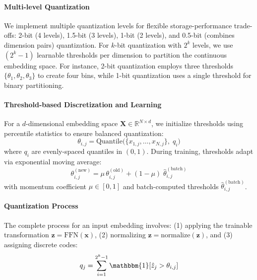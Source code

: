 \paragraph{Multi-level Quantization}
We implement multiple quantization levels for flexible storage-performance trade-offs: 2-bit (4 levels), 1.5-bit (3 levels), 1-bit (2 levels), and 0.5-bit (combines dimension pairs) quantization. For $k$-bit quantization with $2^k$ levels, we use $(2^k - 1)$ learnable thresholds per dimension to partition the continuous embedding space. For instance, 2-bit quantization employs three thresholds $\{\theta_1, \theta_2, \theta_3\}$ to create four bins, while 1-bit quantization uses a single threshold for binary partitioning.

\paragraph{Threshold-based Discretization and Learning}
For a $d$-dimensional embedding space $\mathbf{X} \in \mathbb{R}^{N \times d}$, we initialize thresholds using percentile statistics to ensure balanced quantization:
\begin{equation}
    \theta_{i,j} = \text{Quantile}\bigl(\{x_{1,j}, \ldots, x_{N,j}\},\; q_i\bigr)
\end{equation}
where $q_i$ are evenly-spaced quantiles in $(0,1)$. During training, thresholds adapt via exponential moving average:
\begin{equation}
    \theta_{i,j}^{(\text{new})} = \mu\,\theta_{i,j}^{(\text{old})} + (1-\mu)\;\widehat{\theta}_{i,j}^{(\text{batch})}
\end{equation}
with momentum coefficient $\mu \in [0,1]$ and batch-computed thresholds $\widehat{\theta}_{i,j}^{(\text{batch})}$.

\paragraph{Quantization Process}
The complete process for an input embedding involves: (1) applying the trainable transformation $\mathbf{z} = \text{FFN}(\mathbf{x})$, (2) normalizing $\hat{\mathbf{z}} = \text{normalize}(\mathbf{z})$, and (3) assigning discrete codes:
\begin{equation}
    q_j = \sum_{i=1}^{2^k-1} \mathbbm{1}[\hat{z}_j > \theta_{i,j}]
\end{equation}


